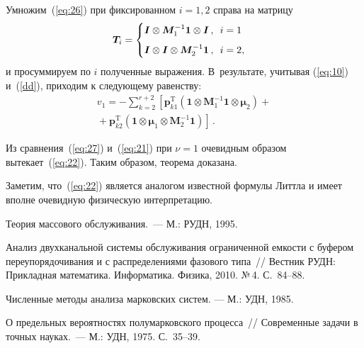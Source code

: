 \begin{multicols}{2}
Умножим~(\ref{eq:26}) при фиксированном $i=1,2$ справа на матрицу
\begin{equation*}
\boldsymbol{T}_i=
\begin{cases}
\boldsymbol{I}\otimes\boldsymbol{M}_1^{-1}\boldsymbol{1}\otimes\boldsymbol{I}\,, \enskip i=1\,\\[6pt]
\boldsymbol{I}\otimes\boldsymbol{I}\otimes\boldsymbol{M}_2^{-1}\boldsymbol{1}\,, \enskip i=2,
\end{cases}
\end{equation*}
и просуммируем по $i$ полученные выражения. В~результате, учитывая (\ref{eq:10}) и~(\ref{dd}), 
приходим к сле\-ду\-ющему равенству:
\begin{multline}
\label{eq:27}
v_1=-\sum\limits_{k=2}^{r+2}\left[\boldsymbol{p}_{k1}^{\mathrm{T}}
(\boldsymbol{1}\otimes\boldsymbol{M}_1^{-1}\boldsymbol{1} \otimes\boldsymbol{\mu}_2)+{}\right.\\
\left.{}+
\boldsymbol{p}_{k2}^{\mathrm{T}}
(\boldsymbol{1}\otimes\boldsymbol{\mu}_1 \otimes\boldsymbol{M}_2^{-1}\boldsymbol{1})\right]\,.
\end{multline}

Из сравнения~(\ref{eq:27}) и~(\ref{eq:21}) при $\nu=1$ очевидным образом вытекает~(\ref{eq:22}). 
Таким образом, теорема доказана.


Заметим, что~(\ref{eq:22}) является аналогом известной формулы Литтла и имеет вполне очевидную физическую интерпретацию.

{\small\frenchspacing
{%
\begin{thebibliography}{9}

Теория массового обслуживания.~--- М.:  РУДН, 1995.

Анализ двухканальной системы обслуживания ограниченной емкости с буфером переупорядочивания и с распределениями фазового типа~// 
Вестник РУДН: Прикладная математика. Информатика. Физика, 2010. №\,4. С.~84--88.

 Численные методы анализа марковских систем. --- М.: УДН, 1985.
 
 \label{end\stat}

 О предельных вероятностях полумарковского процесса~// Современные задачи в точных науках.~--- М.: УДН, 1975. С.~35--39.
 \end{thebibliography}
}
}


\end{multicols}